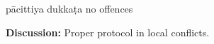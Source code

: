 \begin{exam}{\autoExamName}
\begin{problem}
    \bigskip

    \begin{answers}{3}
      \bChoices
       pācittiya\eAns
       dukkaṭa\eAns
       no offences\eAns
      \eChoices
    \end{answers}

    \bigskip

    \textbf{Discussion:} Proper protocol in local conflicts.

  \end{problem}

\end{exam}

